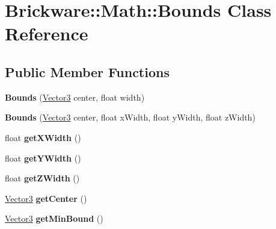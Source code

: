 \hypertarget{classBrickware_1_1Math_1_1Bounds}{}\section{Brickware\+:\+:Math\+:\+:Bounds Class Reference}
\label{classBrickware_1_1Math_1_1Bounds}
\subsection*{Public Member Functions}
\begin{DoxyCompactItemize}
\item 
\hypertarget{classBrickware_1_1Math_1_1Bounds_a8fa9faca0d2bcb04ef577355149f6984}{}{\bfseries Bounds} (\hyperlink{classBrickware_1_1Math_1_1Vector3}{Vector3} center, float width)\label{classBrickware_1_1Math_1_1Bounds_a8fa9faca0d2bcb04ef577355149f6984}

\item 
\hypertarget{classBrickware_1_1Math_1_1Bounds_a04f325efe6973115bfd20c9aecb3a25c}{}{\bfseries Bounds} (\hyperlink{classBrickware_1_1Math_1_1Vector3}{Vector3} center, float x\+Width, float y\+Width, float z\+Width)\label{classBrickware_1_1Math_1_1Bounds_a04f325efe6973115bfd20c9aecb3a25c}

\item 
\hypertarget{classBrickware_1_1Math_1_1Bounds_a7bbe91dec5300857abd8584c41d28386}{}float {\bfseries get\+X\+Width} ()\label{classBrickware_1_1Math_1_1Bounds_a7bbe91dec5300857abd8584c41d28386}

\item 
\hypertarget{classBrickware_1_1Math_1_1Bounds_a4413b729975882c6006eafab33f67af0}{}float {\bfseries get\+Y\+Width} ()\label{classBrickware_1_1Math_1_1Bounds_a4413b729975882c6006eafab33f67af0}

\item 
\hypertarget{classBrickware_1_1Math_1_1Bounds_aea4ef267ae617cd5d3e0b5bce0a49e6c}{}float {\bfseries get\+Z\+Width} ()\label{classBrickware_1_1Math_1_1Bounds_aea4ef267ae617cd5d3e0b5bce0a49e6c}

\item 
\hypertarget{classBrickware_1_1Math_1_1Bounds_a8b3ea501c82c6cec0fb7d76852f640a7}{}\hyperlink{classBrickware_1_1Math_1_1Vector3}{Vector3} {\bfseries get\+Center} ()\label{classBrickware_1_1Math_1_1Bounds_a8b3ea501c82c6cec0fb7d76852f640a7}

\item 
\hypertarget{classBrickware_1_1Math_1_1Bounds_a660d65c24492d33fe87a53e15245ef73}{}\hyperlink{classBrickware_1_1Math_1_1Vector3}{Vector3} {\bfseries get\+Min\+Bound} ()\label{classBrickware_1_1Math_1_1Bounds_a660d65c24492d33fe87a53e15245ef73}


\end{DoxyCompactItemize}
